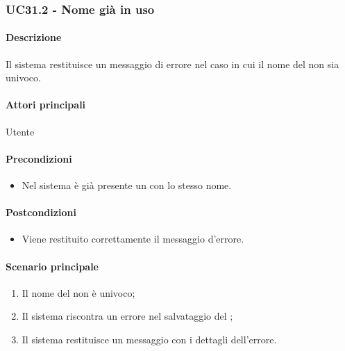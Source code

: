 
\subsubsection{UC31.2 - Nome già in uso}\label{UC31point2}
\paragraph*{Descrizione}
Il sistema restituisce un messaggio di errore nel caso in cui il nome del  non sia univoco.

\paragraph*{Attori principali}
Utente

\paragraph*{Precondizioni}
\begin{itemize}
  \item Nel sistema è già presente un  con lo stesso nome.
\end{itemize}

\paragraph*{Postcondizioni}
\begin{itemize}
  \item Viene restituito correttamente il messaggio d'errore.
\end{itemize}

\paragraph*{Scenario principale}
\begin{enumerate}
  \item Il nome del  non è univoco;
  \item Il sistema riscontra un errore nel salvataggio del ;
  \item Il sistema restituisce un messaggio con i dettagli dell'errore.  
\end{enumerate}
